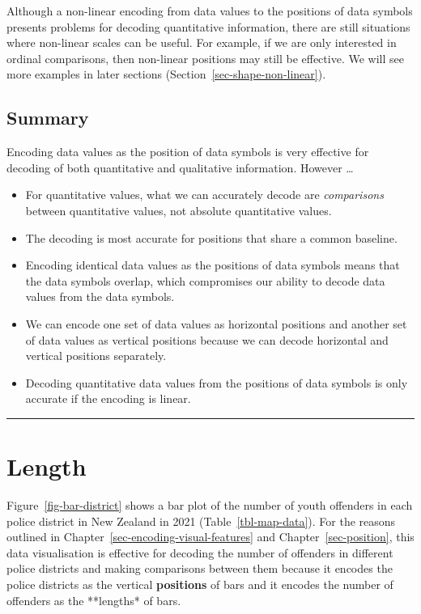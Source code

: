 \documentclass[
  letterpaper,
  DIV=11,
  numbers=noendperiod]{scrreprt}
\begin{document}
Although a non-linear encoding from data values to the positions of data
symbols presents problems for decoding quantitative information, there
are still situations where non-linear scales can be useful. For example,
if we are only interested in ordinal comparisons, then non-linear
positions may still be effective. We will see more examples in later
sections (Section~\ref{sec-shape-non-linear}).

\section{Summary}\label{summary-3}

Encoding data values as the position of data symbols is very effective
for decoding of both quantitative and qualitative information. However
\ldots{}

\begin{itemize}
\item
  For quantitative values, what we can accurately decode are
  \emph{comparisons} between quantitative values, not absolute
  quantitative values.
\item
  The decoding is most accurate for positions that share a common
  baseline.
\item
  Encoding identical data values as the positions of data symbols means
  that the data symbols overlap, which compromises our ability to decode
  data values from the data symbols.
\item
  We can encode one set of data values as horizontal positions and
  another set of data values as vertical positions because we can decode
  horizontal and vertical positions separately.
\item
  Decoding quantitative data values from the positions of data symbols
  is only accurate if the encoding is linear.
\end{itemize}

\begin{center}\rule{0.5\linewidth}{0.5pt}\end{center}

\theendnotes


\chapter{Length}\label{sec-quantitative}

Figure~\ref{fig-bar-district} shows a bar plot of the number of youth
offenders in each police district in New Zealand in 2021
(Table~\ref{tbl-map-data}). For the reasons outlined in
Chapter~\ref{sec-encoding-visual-features} and
Chapter~\ref{sec-position}, this data visualisation is effective for
decoding the number of offenders in different police districts and
making comparisons between them because it encodes the police districts
as the vertical \textbf{positions} of bars and it encodes the number of
offenders as the **lengths* of bars.
\end{document}
